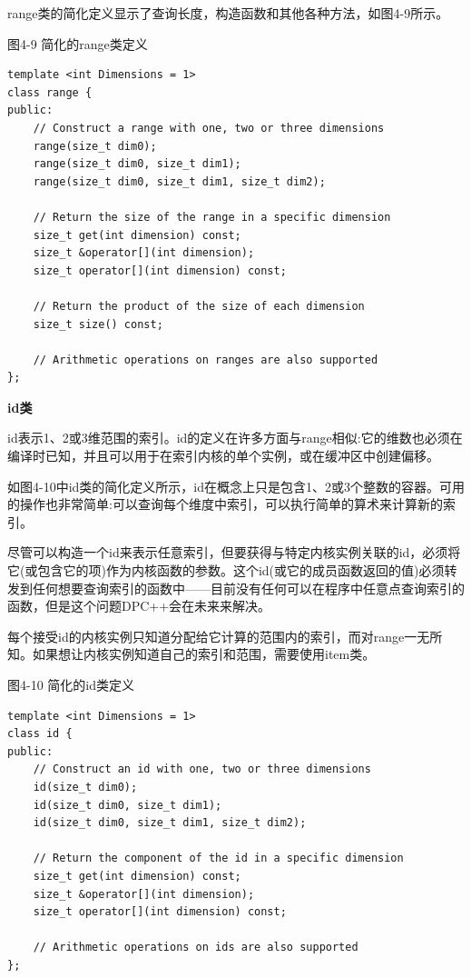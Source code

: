 range类的简化定义显示了查询长度，构造函数和其他各种方法，如图4-9所示。\par

\hspace*{\fill} \par %
图4-9 简化的range类定义
\begin{lstlisting}[caption={}]
template <int Dimensions = 1>
class range {
public:
	// Construct a range with one, two or three dimensions
	range(size_t dim0);
	range(size_t dim0, size_t dim1);
	range(size_t dim0, size_t dim1, size_t dim2);
	
	// Return the size of the range in a specific dimension 
	size_t get(int dimension) const;
	size_t &operator[](int dimension);
	size_t operator[](int dimension) const;
	
	// Return the product of the size of each dimension
	size_t size() const;
	
	// Arithmetic operations on ranges are also supported
};
\end{lstlisting}

\hspace*{\fill} \par %
\textbf{id类}

id表示1、2或3维范围的索引。id的定义在许多方面与range相似:它的维数也必须在编译时已知，并且可以用于在索引内核的单个实例，或在缓冲区中创建偏移。\par

如图4-10中id类的简化定义所示，id在概念上只是包含1、2或3个整数的容器。可用的操作也非常简单:可以查询每个维度中索引，可以执行简单的算术来计算新的索引。\par

尽管可以构造一个id来表示任意索引，但要获得与特定内核实例关联的id，必须将它(或包含它的项)作为内核函数的参数。这个id(或它的成员函数返回的值)必须转发到任何想要查询索引的函数中——目前没有任何可以在程序中任意点查询索引的函数，但是这个问题DPC++会在未来来解决。\par

每个接受id的内核实例只知道分配给它计算的范围内的索引，而对range一无所知。如果想让内核实例知道自己的索引和范围，需要使用item类。\par

\hspace*{\fill} \par %
图4-10 简化的id类定义
\begin{lstlisting}[caption={}]
template <int Dimensions = 1>
class id {
public:
	// Construct an id with one, two or three dimensions
	id(size_t dim0);
	id(size_t dim0, size_t dim1);
	id(size_t dim0, size_t dim1, size_t dim2);
	
	// Return the component of the id in a specific dimension 
	size_t get(int dimension) const;
	size_t &operator[](int dimension);
	size_t operator[](int dimension) const;
	
	// Arithmetic operations on ids are also supported
};
\end{lstlisting}

